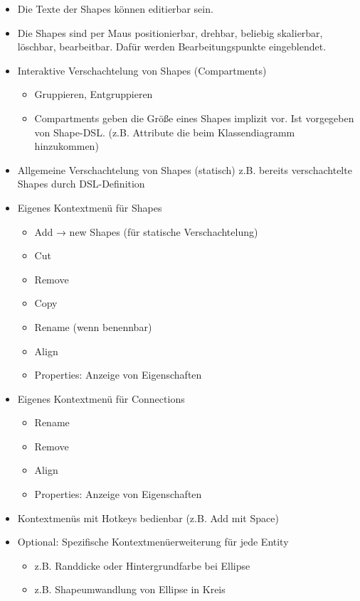 \begin{itemize}
  \item Die Texte der Shapes können editierbar sein.
  \item Die Shapes sind per Maus positionierbar, drehbar, beliebig skalierbar, löschbar, bearbeitbar. Dafür werden Bearbeitungspunkte eingeblendet.
  \item Interaktive Verschachtelung von Shapes (Compartments)
    \begin{itemize}
      \item Gruppieren, Entgruppieren
      \item Compartments geben die Größe eines Shapes implizit vor. Ist vorgegeben von Shape-DSL. (z.B. Attribute die beim Klassendiagramm hinzukommen)
    \end{itemize}
  \item Allgemeine Verschachtelung von Shapes (statisch) z.B. bereits verschachtelte Shapes durch DSL-Definition
  \item Eigenes Kontextmenü für Shapes
    \begin{itemize}
      \item Add → new Shapes (für statische Verschachtelung)
      \item Cut
      \item Remove
      \item Copy
      \item Rename (wenn benennbar)
      \item Align
      \item Properties: Anzeige von Eigenschaften
    \end{itemize}
  \item Eigenes Kontextmenü für Connections
    \begin{itemize}
      \item Rename
      \item Remove
      \item Align
      \item Properties: Anzeige von Eigenschaften
    \end{itemize}
  \item Kontextmenüs mit Hotkeys bedienbar (z.B. Add mit Space)
  \item Optional: Spezifische Kontextmenüerweiterung für jede Entity
    \begin{itemize}
      \item z.B. Randdicke oder Hintergrundfarbe bei Ellipse
      \item z.B. Shapeumwandlung von Ellipse in Kreis

\end{itemize}
\end{itemize}
